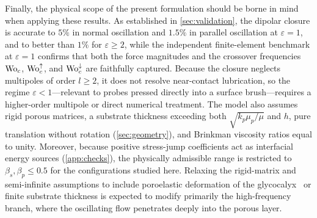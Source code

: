 Finally, the physical scope of the present formulation should be borne in mind when applying these results. As
established in \cref{sec:validation}, the dipolar closure is accurate to $5\%$ in normal oscillation and $1.5\%$ in
parallel oscillation at $\varepsilon=1$, and to better than $1\%$ for $\varepsilon\ge2$, while the independent
finite-element benchmark at $\varepsilon=1$ confirms that both the force magnitudes and the crossover frequencies
$\mathrm{Wo}_c$, $\mathrm{Wo}_c^{\uparrow}$, and $\mathrm{Wo}_c^{\downarrow}$ are faithfully captured. Because the closure neglects multipoles of
order $l\ge2$, it does not resolve near-contact lubrication, so the regime $\varepsilon<1$---relevant to probes pressed
directly into a surface brush---requires a higher-order multipole or direct numerical treatment. The model also assumes
rigid porous matrices, a substrate thickness exceeding both $\sqrt{k_p\mu_p/\mu}$ and $h$, pure translation without
rotation (\cref{sec:geometry}), and Brinkman viscosity ratios equal to unity. Moreover, because positive stress-jump
coefficients act as interfacial energy sources (\cref{app:checks}), the physically admissible range is restricted to
$\beta_s,\beta_p\le0.5$ for the configurations studied here. Relaxing the rigid-matrix and semi-infinite assumptions to
include poroelastic deformation of the glycocalyx~\cite{batalha2026elasto} or finite substrate thickness is expected to
modify primarily the high-frequency branch, where the oscillating flow penetrates deeply into the porous layer.
